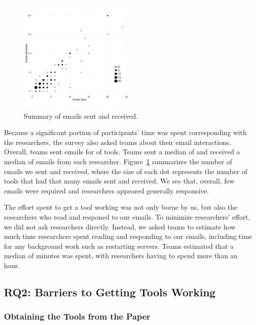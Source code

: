 \documentclass[10pt,conference]{IEEEtran}
\begin{document}
\begin{figure}[!ht]
  \centering
    \includegraphics[width=0.5\textwidth]{emailPlot.pdf}
  \caption{Summary of emails sent and received.}\label{fig:emailSnR}
\end{figure}

Because a significant portion of participants' time was
spent corresponding with the researchers,
the survey also asked teams about their email interactions.
Overall, teams sent emails for \emailsPercentSent of tools.
Teams sent a median of \emailsSent and received 
a median of \emailsRecieved emails from each researcher.
Figure~\ref{fig:emailSnR} summarizes the number of emails
we sent and received, where the size of each dot
represents the number of tools that had
that many emails sent and received.
We see that, overall, few emails were required
and researchers appeared generally responsive.

The effort spent to get a tool working was not only
borne by us, but also the researchers who 
read and responed to our emails.
To minimize researchers' effort, we did not ask researchers directly.
Instead, we asked teams to estimate how much time researchers spent 
reading and responding to our emails, including time for 
any background work such as restarting servers.
Teams estimated that a median of \durationAuthorResponse minutes 
was spent, with \durationAuthorResponseCountHigh researchers having
to spend more than an hour.

\subsection{RQ2: Barriers to Getting Tools Working}

\subsubsection{Obtaining the Tools from the Paper}
\end{document}
